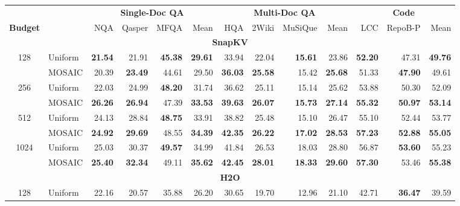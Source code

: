 \begin{table}[tp]
  \centering
  \scriptsize
  \setlength{\tabcolsep}{3pt}
  \renewcommand{\arraystretch}{0.92}
  \begin{tabular}{@{} c l rrrr rrrr rrr @{}}
    \toprule
    & & \multicolumn{4}{c}{\textbf{Single-Doc QA}} & \multicolumn{4}{c}{\textbf{Multi-Doc QA}} & \multicolumn{3}{c}{\textbf{Code}} \\
    \cmidrule(lr){3-6} \cmidrule(lr){7-10} \cmidrule(lr){11-13}
    \textbf{Budget} & & NQA & Qasper & MFQA & Mean & HQA & 2Wiki & MuSiQue & Mean & LCC & RepoB-P & Mean \\
    \midrule
    \multicolumn{13}{c}{\textbf{SnapKV}} \\
    \midrule
    \multirow{2}{*}{128} & Uniform & \textbf{21.54} & 21.91 & \textbf{45.38} & \textbf{29.61} & 33.94 & 22.04 & \textbf{15.61} & 23.86 & \textbf{52.20} & 47.31 & \textbf{49.76} \\
     & MOSAIC & 20.39 & \textbf{23.49} & 44.61 & 29.50 & \textbf{36.03} & \textbf{25.58} & 15.42 & \textbf{25.68} & 51.33 & \textbf{47.90} & 49.61 \\
    \cmidrule(l){1-13}
    \multirow{2}{*}{256} & Uniform & 22.03 & 24.99 & \textbf{48.20} & 31.74 & 36.62 & 25.11 & 15.14 & 25.62 & 53.88 & 50.30 & 52.09 \\
     & MOSAIC & \textbf{26.26} & \textbf{26.94} & 47.39 & \textbf{33.53} & \textbf{39.63} & \textbf{26.07} & \textbf{15.73} & \textbf{27.14} & \textbf{55.32} & \textbf{50.97} & \textbf{53.14} \\
    \cmidrule(l){1-13}
    \multirow{2}{*}{512} & Uniform & 24.13 & 28.84 & \textbf{48.75} & 33.91 & 38.82 & 25.48 & 15.10 & 26.47 & 55.10 & 52.44 & 53.77 \\
     & MOSAIC & \textbf{24.92} & \textbf{29.69} & 48.55 & \textbf{34.39} & \textbf{42.35} & \textbf{26.22} & \textbf{17.02} & \textbf{28.53} & \textbf{57.23} & \textbf{52.88} & \textbf{55.05} \\
    \cmidrule(l){1-13}
    \multirow{2}{*}{1024} & Uniform & 25.03 & 30.37 & \textbf{49.57} & 34.99 & 41.84 & 26.53 & 18.03 & 28.80 & 56.87 & \textbf{53.60} & 55.23 \\
     & MOSAIC & \textbf{25.40} & \textbf{32.34} & 49.11 & \textbf{35.62} & \textbf{42.45} & \textbf{28.01} & \textbf{18.33} & \textbf{29.60} & \textbf{57.30} & 53.46 & \textbf{55.38} \\
    \midrule
    \multicolumn{13}{c}{\textbf{H2O}} \\
    \midrule
    \multirow{2}{*}{128} & Uniform & 22.16 & 20.57 & 35.88 & 26.20 & 30.65 & 19.70 & 12.96 & 21.10 & 42.71 & \textbf{36.47} & 39.59 \\

\end{tabular}
\end{table}
